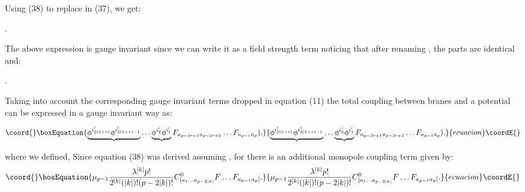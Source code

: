 \documentclass[a4paper,12pt]{article}
\begin{document}
Using  (38) to replace \coordHE{} in (37), we get:
\begin{center}
\coordHE{} \newline
{}\coordHE{}.
\end{center}
The above expression is gauge invariant since we can write it as a field strength term noticing that after renaming \coordHE{}, the \coordHE{} parts are identical and:
\begin{center}
\coordHE{}.
\end{center}
Taking into account the corresponding gauge invariant terms dropped in equation (11) the total coupling between \coordHE{}  \coordHE{} branes and a \coordHE{} potential can be expressed in a gauge invariant way as:
\begin{center}
\coordHE{}
\begin{equation}\coord{}\boxEquation{ 
\underbrace{\phi^{i_{2(k+r)}'}\phi^{i_{2(k+r)-1}'}}\ldots \underbrace{\phi^{i_2'}\phi^{i_1'}}F_{a_{p-2r+1}a_{p-2r+2}}\ldots F_{a_{p-1}a_p}).
}{ 
\underbrace{\phi^{i_{2(k+r)}'}\phi^{i_{2(k+r)-1}'}}\ldots \underbrace{\phi^{i_2'}\phi^{i_1'}}F_{a_{p-2r+1}a_{p-2r+2}}\ldots F_{a_{p-1}a_p}).
}{ecuacion}\coordE{}\end{equation}
\end{center}
where we defined,\newline
\hspace*{1.5cm}\coordHE{} \newline
 Since equation (38) was derived assuming \coordHE{}, for \coordHE{}  there is an additional monopole coupling term given by:
\begin{equation}\coord{}\boxEquation{
\mu_{p-1}\frac{\lambda^{|k|}p!}{2^{|k|}(|k|)!(p-2|k|)!}C^0_{[a_1\ldots a_{p-2|k|}}F\ldots F_{a_{p-1}a_p]}.
}{
\mu_{p-1}\frac{\lambda^{|k|}p!}{2^{|k|}(|k|)!(p-2|k|)!}C^0_{[a_1\ldots a_{p-2|k|}}F\ldots F_{a_{p-1}a_p]}.
}{ecuacion}\coordE{}\end{equation}
\end{document}
